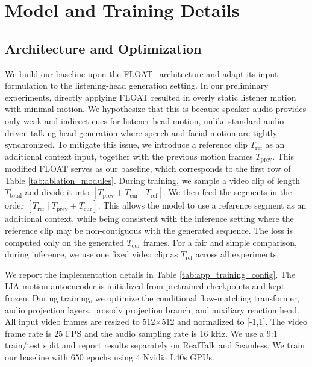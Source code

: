 \section{Model and Training Details}  \label{app:model_training}

\subsection{Architecture and Optimization}  \label{app:architecture_optimization}

{We build our baseline upon the FLOAT~\cite{ki2025float} architecture and adapt its input formulation to the listening-head generation setting. In our preliminary experiments, directly applying FLOAT resulted in overly static listener motion with minimal motion. We hypothesize that this is because speaker audio provides only weak and indirect cues for listener head motion, unlike standard audio-driven talking-head generation where speech and facial motion are tightly synchronized. To mitigate this issue, we introduce a reference clip $T_{\text{ref}}$ as an additional context input, together with the previous motion frames $T_{\text{prev}}$. This modified FLOAT serves as our baseline, which corresponds to the first row of Table \ref{tab:ablation_modules}. During training, we sample a video clip of length $T_{\text{total}}$ and divide it into $[T_{\text{prev}} + T_{\text{cur}} \mid T_{\text{ref}}]$. We then feed the segments in the order $[T_{\text{ref}} \mid T_{\text{prev}} + T_{\text{cur}}]$. This allows the model to use a reference segment as an additional context, while being consistent with the inference setting where the reference clip may be non-contiguous with the generated sequence. The loss is computed only on the generated $T_{\text{cur}}$ frames. For a fair and simple comparison, during inference, we use one fixed video clip as $T_{\text{ref}}$ across all experiments.}

We report the implementation details in Table \ref{tab:app_training_config}. The LIA motion autoencoder \cite{wang2022lia} is initialized from pretrained checkpoints and kept frozen. During training, we optimize the conditional flow-matching transformer, audio projection layers, prosody projection branch, and auxiliary reaction head. All input video frames are resized to 512$\times$512 and normalized to [-1,1]. The video frame rate is 25 FPS and the audio sampling rate is 16 kHz. We use a 9:1 train/test split and report results separately on RealTalk and Seamless. We train our baseline with 650 epochs using 4 Nvidia L40s GPUs.

